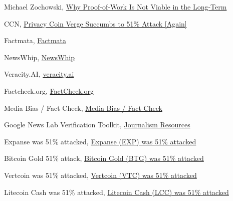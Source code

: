 \documentclass[target=mst,aauheader=]{thud}
\begin{document}

\begin{thebibliography}{99}

    Michael Zochowski, \href{https://medium.com/logos-network/why-proof-of-work-is-not-viable-in-the-long-term-dd96d2775e99}{Why Proof-of-Work Is Not Viable in the Long-Term}

    CCN, \href{https://www.ccn.com/privacy-coin-verge-succumbs-to-51-attack-again/}{Privacy Coin Verge Succumbs to 51\% Attack [Again]}

    Factmata, \href{https://factmata.com/}{Factmata}

    NewsWhip, \href{https://www.newswhip.com/}{NewsWhip}

    Veracity.AI, \href{https://veracityai.com/en/}{veracity.ai}

    Factcheck.org, \href{https://www.factcheck.org/}{FactCheck.org}

    Media Bias / Fact Check, \href{https://mediabiasfactcheck.com/}{Media Bias / Fact Check}

    Google News Lab Verification Toolkit, \href{https://newsinitiative.withgoogle.com/resources/journalism/}{Journalism Resources}

    Expanse was 51\% attacked, \href{https://gist.github.com/metalicjames/01222049f95f85df8c0eb253de54848b}{Expanse (EXP) was 51\% attacked}

    Bitcoin Gold 51\% attack, \href{https://gist.github.com/metalicjames/71321570a105940529e709651d0a9765}{Bitcoin Gold (BTG) was 51\% attacked}

    Vertcoin was 51\% attacked, \href{https://gist.github.com/metalicjames/f2acdb9ef448ec5298173b36c7c54133}{Vertcoin (VTC) was 51\% attacked}

    Litecoin Cash was 51\% attacked, \href{https://gist.github.com/metalicjames/82a49f8afa87334f929881e55ad4ffd7}{Litecoin Cash (LCC) was 51\% attacked}


\end{thebibliography}
\end{document}
